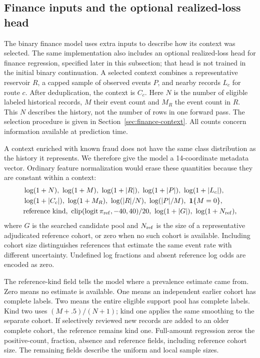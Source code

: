 \documentclass[11pt]{article}
\newcommand{\ind}{\mathbf{1}}
\begin{document}
\subsection{Finance inputs and the optional realized-loss head}
\label{sec:finance-head}

The binary finance model uses extra inputs to describe how its context was selected. The same implementation also includes an optional realized-loss head for finance regression, specified later in this subsection; that head is not trained in the initial binary continuation. A selected context combines a representative reservoir $R$, a capped sample of observed events $P$, and nearby records $L_c$ for route $c$. After deduplication, the context is $C_c$. Here $N$ is the number of eligible labeled historical records, $M$ their event count and $M_R$ the event count in $R$. This $N$ describes the history, not the number of rows in one forward pass. The selection procedure is given in Section~\ref{sec:finance-context}. All counts concern information available at prediction time.

A context enriched with known fraud does not have the same class distribution as the history it represents. We therefore give the model a 14-coordinate metadata vector. Ordinary feature normalization would erase these quantities because they are constant within a context:
\begin{align*}
&\log(1+N),\ \log(1+M),\ \log(1+|R|),\ \log(1+|P|),\ \log(1+|L_c|),\\
&\log(1+|C_c|),\ \log(1+M_R),\ \log(|R|/N),\ \log(|P|/M),\ \ind\{M=0\},\\
&\mathrm{reference\ kind},\ \operatorname{clip}(\operatorname{logit}\pi_{\rm ref},-40,40)/20,\ \log(1+|G|),\ \log(1+N_{\rm ref}),
\end{align*}
where $G$ is the searched candidate pool and $N_{\rm ref}$ is the size of a representative adjudicated reference cohort, or zero when no such cohort is available. Including cohort size distinguishes references that estimate the same event rate with different uncertainty. Undefined log fractions and absent reference log odds are encoded as zero.

The reference-kind field tells the model where a prevalence estimate came from. Zero means no estimate is available. One means an independent earlier cohort has complete labels. Two means the entire eligible support pool has complete labels. Kind two uses $(M+.5)/(N+1)$; kind one applies the same smoothing to the separate cohort. If selectively reviewed new records are added to an older complete cohort, the reference remains kind one. Full-amount regression zeros the positive-count, fraction, absence and reference fields, including reference cohort size. The remaining fields describe the uniform and local sample sizes.
\end{document}
